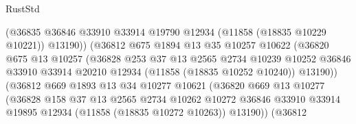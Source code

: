 \begin{lexlean}{RustStd}
\begin{coremodule}
                                (@36835
                                  @36846
                                  @33910
                                  @33914
                                  @19790
                                  @12934
                                  (@11858 (@18835 @10229 @10221))
                                  @13190))
                              (@36812
                                @675
                                @1894
                                @13
                                @35
                                @10257
                                @10622
                                (@36820
                                  @675
                                  @13
                                  @10257
                                  (@36828
                                    @253
                                    @37
                                    @13
                                    @2565
                                    @2734
                                    @10239
                                    @10252
                                    @36846
                                    @33910
                                    @33914
                                    @20210
                                    @12934
                                    (@11858 (@18835 @10252 @10240))
                                    @13190))
                                (@36812
                                  @669
                                  @1893
                                  @13
                                  @34
                                  @10277
                                  @10621
                                  (@36820
                                    @669
                                    @13
                                    @10277
                                    (@36828
                                      @158
                                      @37
                                      @13
                                      @2565
                                      @2734
                                      @10262
                                      @10272
                                      @36846
                                      @33910
                                      @33914
                                      @19895
                                      @12934
                                      (@11858 (@18835 @10272 @10263))
                                      @13190))
                                  (@36812

\end{coremodule}
\end{lexlean}
